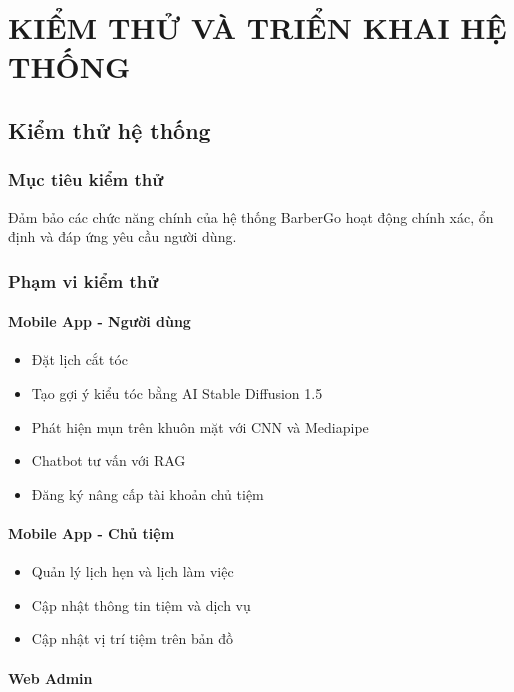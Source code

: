 \chapter{KIỂM THỬ VÀ TRIỂN KHAI HỆ THỐNG}


\section{Kiểm thử hệ thống}

\subsection{Mục tiêu kiểm thử}

Đảm bảo các chức năng chính của hệ thống BarberGo hoạt động chính xác, ổn định và đáp ứng yêu cầu người dùng.

\subsection{Phạm vi kiểm thử}

\subsubsection{Mobile App - Người dùng}

\begin{itemize}
    \item Đặt lịch cắt tóc
    \item Tạo gợi ý kiểu tóc bằng AI Stable Diffusion 1.5
    \item Phát hiện mụn trên khuôn mặt với CNN và Mediapipe
    \item Chatbot tư vấn với RAG
    \item Đăng ký nâng cấp tài khoản chủ tiệm
\end{itemize}

\subsubsection{Mobile App - Chủ tiệm}

\begin{itemize}
    \item Quản lý lịch hẹn và lịch làm việc
    \item Cập nhật thông tin tiệm và dịch vụ
    \item Cập nhật vị trí tiệm trên bản đồ
\end{itemize}

\subsubsection{Web Admin}

